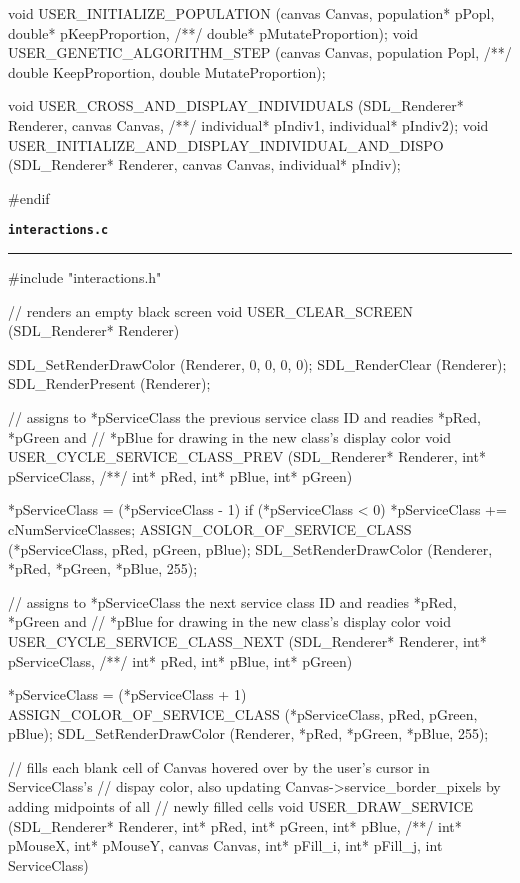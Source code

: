 \begin{C}
void USER_INITIALIZE_POPULATION (canvas Canvas, population* pPopl, double* pKeepProportion,
/**/ double* pMutateProportion);
void USER_GENETIC_ALGORITHM_STEP (canvas Canvas, population Popl,
/**/ double KeepProportion, double MutateProportion);

void USER_CROSS_AND_DISPLAY_INDIVIDUALS (SDL_Renderer* Renderer, canvas Canvas,
/**/ individual* pIndiv1, individual* pIndiv2);
void USER_INITIALIZE_AND_DISPLAY_INDIVIDUAL_AND_DISPO (SDL_Renderer* Renderer,
canvas Canvas, individual* pIndiv);

#endif
\end{C}
\vspace*{5mm}
{\Large \texttt{\textbf{interactions.c}}}
\vspace*{1mm}
\hrule
\begin{C}
#include "interactions.h"

// renders an empty black screen
void USER_CLEAR_SCREEN (SDL_Renderer* Renderer){
	
	SDL_SetRenderDrawColor (Renderer, 0, 0, 0, 0);
	SDL_RenderClear (Renderer);
	SDL_RenderPresent (Renderer);
}


// assigns to *pServiceClass the previous service class ID and readies *pRed, *pGreen and
// *pBlue for drawing in the new class's display color
void USER_CYCLE_SERVICE_CLASS_PREV (SDL_Renderer* Renderer, int* pServiceClass,
/**/ int* pRed, int* pBlue, int* pGreen){
	
	*pServiceClass = (*pServiceClass - 1) %
	if (*pServiceClass < 0)
	*pServiceClass += cNumServiceClasses;
	ASSIGN_COLOR_OF_SERVICE_CLASS (*pServiceClass, pRed, pGreen, pBlue);
	SDL_SetRenderDrawColor (Renderer, *pRed, *pGreen, *pBlue, 255);
}


// assigns to *pServiceClass the next service class ID and readies *pRed, *pGreen and
// *pBlue for drawing in the new class's display color
void USER_CYCLE_SERVICE_CLASS_NEXT (SDL_Renderer* Renderer, int* pServiceClass,
/**/ int* pRed, int* pBlue, int* pGreen){
	
	*pServiceClass = (*pServiceClass + 1) %
	ASSIGN_COLOR_OF_SERVICE_CLASS (*pServiceClass, pRed, pGreen, pBlue);
	SDL_SetRenderDrawColor (Renderer, *pRed, *pGreen, *pBlue, 255);
}


// fills each blank cell of Canvas hovered over by the user's cursor in ServiceClass's
// dispay color, also updating Canvas->service_border_pixels by adding midpoints of all
// newly filled cells
void USER_DRAW_SERVICE (SDL_Renderer* Renderer, int* pRed, int* pGreen, int* pBlue,
/**/ int* pMouseX, int* pMouseY, canvas Canvas, int* pFill_i, int* pFill_j, int ServiceClass){
	
}
\end{C}
